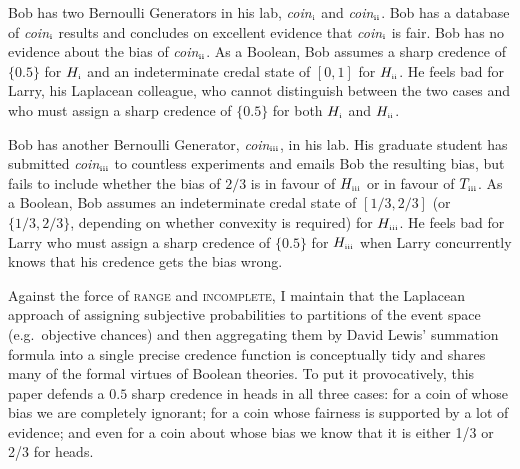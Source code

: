 \documentclass[11pt]{article}
\begin{document}
\begin{quotex}
  \label{ex:range} Bob has two Bernoulli Generators in
  his lab, \textit{coin}$_{\mbox{\tiny{i}}}$ and
  \textit{coin}$_{\mbox{\tiny{ii}}}$. Bob has a database of
  \textit{coin}$_{\mbox{\tiny{i}}}$ results and concludes on excellent
  evidence that \textit{coin}$_{\mbox{\tiny{i}}}$ is fair. Bob has no
  evidence about the bias of \textit{coin}$_{\mbox{\tiny{ii}}}$. As a
  Boolean, Bob assumes a sharp credence of $\{0.5\}$ for
  $H_{\mbox{\tiny{i}}}$ and an indeterminate credal state of $[0,1]$
  for $H_{\mbox{\tiny{ii}}}$. He feels bad for Larry, his Laplacean
  colleague, who cannot distinguish between the two cases and who must
  assign a sharp credence of $\{0.5\}$ for both $H_{\mbox{\tiny{i}}}$
  and $H_{\mbox{\tiny{ii}}}$.
\end{quotex}

\begin{quotex}
  \label{ex:incomp} Bob has another Bernoulli
  Generator, \textit{coin}$_{\mbox{\tiny{iii}}}$, in his lab. His
  graduate student has submitted \textit{coin}$_{\mbox{\tiny{iii}}}$
  to countless experiments and emails Bob the resulting bias, but
  fails to include whether the bias of $2/3$ is in favour of
  $H_{\mbox{\tiny{iii}}}$ or in favour of $T_{\mbox{\tiny{iii}}}$. As
  a Boolean, Bob assumes an indeterminate credal state of $[1/3,2/3]$
  (or $\{1/3,2/3\}$, depending on whether convexity is required) for
  $H_{\mbox{\tiny{iii}}}$. He feels bad for Larry who must assign a
  sharp credence of $\{0.5\}$ for $H_{\mbox{\tiny{iii}}}$ when Larry
  concurrently knows that his credence gets the bias wrong.
\end{quotex}

Against the force of \textsc{range} and \textsc{incomplete}, I
maintain that the Laplacean approach of assigning subjective
probabilities to partitions of the event space (e.g.\ objective
chances) and then aggregating them by David Lewis' summation formula
into a single precise credence function is conceptually tidy and
shares many of the formal virtues of Boolean theories. To put it
provocatively, this paper defends a $0.5$ sharp credence in heads in
all three cases: for a coin of whose bias we are completely ignorant;
for a coin whose fairness is supported by a lot of evidence; and even
for a coin about whose bias we know that it is either 1/3 or 2/3 for
heads.
\end{document}
